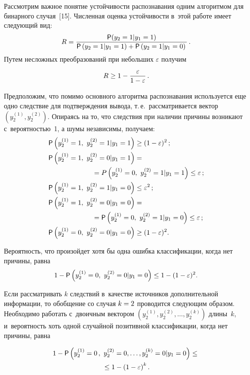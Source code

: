 \begin{multicols}{2}
  Рассмотрим важное понятие устойчивости распознавания одним алгоритмом 
для бинарного случая~[15]. Численная оценка устойчивости в~этой работе имеет 
следующий вид:
  $$
  R= \displaystyle\frac{\displaystyle {\sf P}(y_2=1\vert y_1=1)\mathstrut}{\displaystyle {\sf P}\left(y_2=1\vert y_1=1\right)+{\sf P}\left(y_2=1\vert y_1=0\right)\mathstrut}\,.
  $$
  Путем несложных преобразований при небольших $\varepsilon$ получим 
  $$
  R\geq 1-\displaystyle\frac{\displaystyle \varepsilon\mathstrut}{\displaystyle 1-\varepsilon\mathstrut}\,.
  $$
  
  Предположим, что помимо основного алгоритма распознавания используется 
еще одно следствие для подтверждения вывода, т.\,е.\ рассматривается вектор 
$\left( y_2^{(1)}, y_2^{(2)}\right)$. Опираясь на то, что следствия при наличии 
причины возникают с~вероятностью~1, а шумы независимы, получаем:
  \begin{align*}
 {\sf P}\left( y_2^{(1)}=1,\ y_2^{(2)}=1\vert y_1=1\right) &\geq (1-\varepsilon)^2\,;\\
   {\sf P}\left( y_2^{(1)}=1,\ y_2^{(2)}=0\vert y_1=1\right)& ={}\\
  &\hspace*{-22mm}{}=P\left( y_2^{(1)}=0,\  y_2^{(2)}=1\vert y_1=1\right)\leq \varepsilon\,;\\
   {\sf P}\left( y_2^{(1)}=1,\ y_2^{(2)}=1\vert y_1=0\right)& \leq \varepsilon^2\,;\\
   {\sf P}\left( y_2^{(1)} =1,\ y_2^{(2)}=0\vert  y_1=0\right)&={}\\ 
  &\hspace*{-22mm}{}= {\sf P}\left( y_2^{(1)}=0,\ 
y_2^{(2)}=1\vert y_1=0\right) \leq \varepsilon\,;\\
   {\sf P}\left( y_2^{(1)}=0,\ y_2^{(2)}=0\vert y_1=0\right)&\geq (1-\varepsilon)^2.
  \end{align*}
  
  Вероятность, что произойдет хотя бы одна ошибка классификации, когда нет 
причины, равна
  $$
  1- {\sf P}\left( y_2^{(1)}=0,\ y_2^{(2)}=0\vert y_1=0\right) \leq 1-(1-\varepsilon)^2.
  $$
  
  Если рассматривать $k$ следствий в~качестве источников дополнительной 
информации, то обобщение со случая $k\hm= 2$ проводится следующим образом. 
Необходимо работать с~двоичным вектором $\left( y_2^{(1)}, y_2^{(2)}, \ldots , 
y_2^{(k)}\right)$ длины~$k$, и~вероятность хоть одной случайной позитивной 
классификации, когда нет причины, равна

\vspace*{-8pt}

\noindent
 \begin{multline*}
 1- {\sf P}\left( y_2^{(1)} =0\,,\
  y_2^{(2)}=0,\ldots , y_2^{(k)} =0\vert y_1=0\right) \leq{}\\
  {}\leq  1-\left( 1- \varepsilon\right)^k.
\end{multline*}


\end{multicols}
